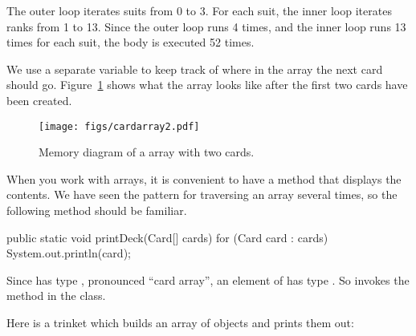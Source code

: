 The outer loop iterates suits from 0 to 3.
For each suit, the inner loop iterates ranks from 1 to 13.
Since the outer loop runs 4 times, and the inner loop runs 13 times for each suit, the body is executed 52 times.


We use a separate variable  to keep track of where in the array the next card should go.
Figure~\ref{fig.cardarray2} shows what the array looks like after the first two cards have been created.

\begin{figure}[!ht]
\begin{center}
\texttt{[image: figs/cardarray2.pdf]}
\caption{Memory diagram of a  array with two cards.}
\label{fig.cardarray2}
\end{center}
\end{figure}


When you work with arrays, it is convenient to have a method that displays the contents.
We have seen the pattern for traversing an array several times, so the following method should be familiar.


\begin{code}
public static void printDeck(Card[] cards) {
    for (Card card : cards) {
        System.out.println(card);
    }
}
\end{code}


Since  has type , pronounced ``card array'', an element of  has type .
So  invokes the  method in the  class.

Here is a trinket which builds an array of  objects and prints them out:

